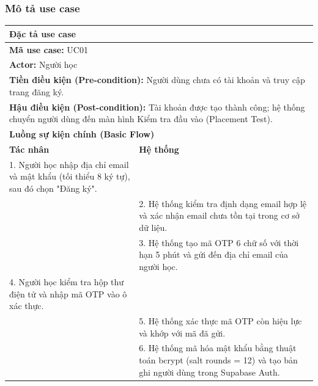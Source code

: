 \documentclass[a4paper,12pt]{extreport}
\begin{document}
\subsubsection{Mô tả use case}
\begin{table}[!ht]
    \centering
    \renewcommand{\arraystretch}{1.1}
    \begin{tabularx}{\linewidth}{|X|X|}
        \hline
        \multicolumn{2}{|l|}{\textbf{Đặc tả use case}} \\ \hline
        \multicolumn{2}{|l|}{\textbf{Mã use case:} UC01} \\ \hline
        \multicolumn{2}{|l|}{\textbf{Actor:} Người học} \\ \hline
        \multicolumn{2}{|p{\dimexpr\linewidth-2\tabcolsep-2\arrayrulewidth}|}{\textbf{Tiền điều kiện (Pre-condition):} Người dùng chưa có tài khoản và truy cập trang đăng ký.} \\ \hline
        \multicolumn{2}{|p{\dimexpr\linewidth-2\tabcolsep-2\arrayrulewidth}|}{\textbf{Hậu điều kiện (Post-condition):} Tài khoản được tạo thành công; hệ thống chuyển người dùng đến màn hình Kiểm tra đầu vào (Placement Test).} \\ \hline
        \multicolumn{2}{|l|}{\textbf{Luồng sự kiện chính (Basic Flow)}} \\ \hline
        \textbf{Tác nhân} & \textbf{Hệ thống} \\ \hline

        1. Người học nhập địa chỉ email và mật khẩu (tối thiểu 8 ký tự), sau đó chọn "Đăng ký". & \\ \hline

        & 2. Hệ thống kiểm tra định dạng email hợp lệ và xác nhận email chưa tồn tại trong cơ sở dữ liệu. \\ \hline

        & 3. Hệ thống tạo mã OTP 6 chữ số với thời hạn 5 phút và gửi đến địa chỉ email của người học. \\ \hline

        4. Người học kiểm tra hộp thư điện tử và nhập mã OTP vào ô xác thực. & \\ \hline

        & 5. Hệ thống xác thực mã OTP còn hiệu lực và khớp với mã đã gửi. \\ \hline

        & 6. Hệ thống mã hóa mật khẩu bằng thuật toán bcrypt (salt rounds = 12) và tạo bản ghi người dùng trong Supabase Auth. \\ \hline


\end{tabularx}
\end{table}
\end{document}
